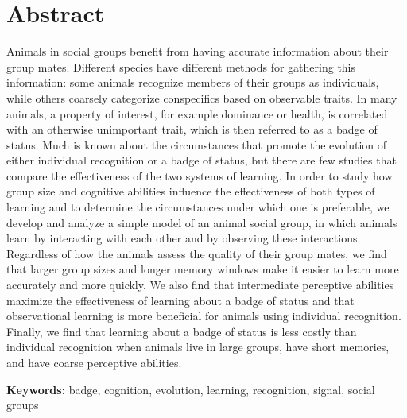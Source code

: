 \section*{Abstract}
Animals in social groups benefit from having accurate information about their group mates. Different species have different methods for gathering this information: some animals recognize members of their groups as individuals, while others coarsely categorize conspecifics based on observable traits. In many animals, a property of interest, for example dominance or health, is correlated with an otherwise unimportant trait, which is then referred to as a badge of status. Much is known about the circumstances that promote the evolution of either individual recognition or a badge of status, but there are few studies that compare the effectiveness of the two systems of learning. In order to study how group size and cognitive abilities influence the effectiveness of both types of learning and to determine the circumstances under which one is preferable, we develop and analyze a simple model of an animal social group, in which animals learn by interacting with each other and by observing these interactions. Regardless of how the animals assess the quality of their group mates, we find that larger group sizes and longer memory windows make it easier to learn more accurately and more quickly. We also find that intermediate perceptive abilities maximize the effectiveness of learning about a badge of status and that observational learning is more beneficial for animals using individual recognition. Finally, we find that learning about a badge of status is less costly than individual recognition when animals live in large groups, have short memories, and have coarse perceptive abilities.



\textbf{Keywords:} badge, cognition, evolution, learning, recognition, signal, social groups

\newpage
